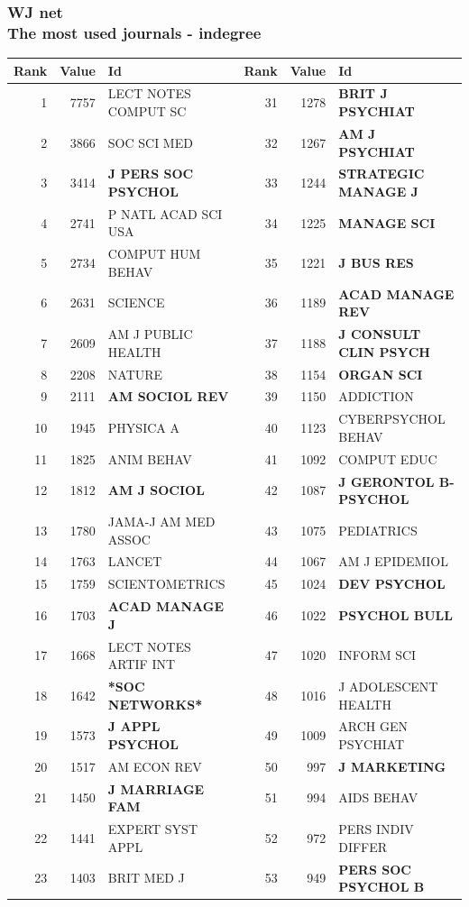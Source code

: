 \documentclass[hyperref={pdfstartview={FitBH -32768},
                         pdfpagemode=FullScreen,
                         plainpages=false,
                         colorlinks=true}
              ]{beamer}
\begin{document}
\begin{frame}[fragile]
\frametitle{WJ net \\ \normalsize The most used journals - indegree}

\renewcommand{\arraystretch}{0.90}
\tiny
\begin{tabular}{r|r|l||r|r|l}
Rank&   	Value&   	Id&   	Rank&   	Value&   	Id \\ \hline
1&	7757&	LECT NOTES COMPUT SC&	31&	1278&	\textbf{BRIT J PSYCHIAT}\\
2&	3866&	SOC SCI MED&	32&	1267&\textbf{AM J PSYCHIAT}\\
3&	3414&	\textbf{J PERS SOC PSYCHOL}&	33&	1244&	\textbf{STRATEGIC MANAGE J}\\
4&	2741&	P NATL ACAD SCI USA&	34&	1225&	\textbf{MANAGE SCI}\\
5&	2734&	COMPUT HUM BEHAV&	35&	1221&	\textbf{J BUS RES}\\
6&	2631&	SCIENCE&	36&	1189&\textbf{ACAD MANAGE REV}\\
7&	2609&	AM J PUBLIC HEALTH&	37&	1188&\textbf{J CONSULT CLIN PSYCH}\\
8&	2208&	NATURE&	38&	1154&\textbf{ORGAN SCI}\\
9&	2111&	\textbf{AM SOCIOL REV}&	39&	1150&	ADDICTION\\
10&	1945&	PHYSICA A&	40&	1123&	CYBERPSYCHOL BEHAV\\
11&	1825&	ANIM BEHAV&	41&	1092&	COMPUT EDUC\\
12&	1812&	\textbf{AM J SOCIOL}&	42&	1087&	\textbf{J GERONTOL B-PSYCHOL}\\
13&	1780&	JAMA-J AM MED ASSOC&	43&	1075&	PEDIATRICS\\
14&	1763&	LANCET&	44&	1067&	AM J EPIDEMIOL\\
15&	1759&	SCIENTOMETRICS&	45&	1024&\textbf{DEV PSYCHOL}\\
16&	1703&	\textbf{ACAD MANAGE J}&	46&	1022&\textbf{PSYCHOL BULL}\\
17&	1668&	LECT NOTES ARTIF INT&	47&	1020&	INFORM SCI\\
18&	1642&\textbf{*SOC NETWORKS*}&	48&	1016&	J ADOLESCENT HEALTH\\
19&	1573&\textbf{J APPL PSYCHOL}&	49&	1009&	ARCH GEN PSYCHIAT\\
20&	1517&	AM ECON REV&	50&	997&\textbf{J MARKETING}\\
21&	1450&	\textbf{J MARRIAGE FAM}&	51&	994&	AIDS BEHAV\\
22&	1441&	EXPERT SYST APPL&	52&	972&	PERS INDIV DIFFER\\
23&	1403&	BRIT MED J&	53&	949&\textbf{PERS SOC PSYCHOL B}\\

\end{tabular}
\end{frame}
\end{document}
